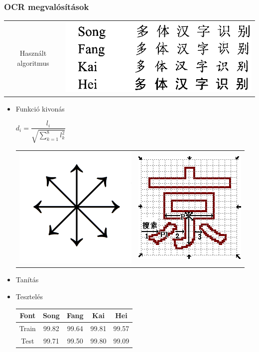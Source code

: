\documentclass{beamer}
\begin{document}
\begin{frame}[fragile]
\frametitle{OCR megvalósítások}
\begin{tabular}{c c}
{\large Használt algoritmus} & 
\includegraphics[scale=0.2, center]{chinese_fonts1}
\end{tabular}
\begin{itemize}
\item Funkció kivonás

\(d_i = \dfrac{l_i}{\sqrt{\displaystyle \sum_{k=1}^8 l_k^2}}\)
\begin{tabular}{ c c }
\includegraphics[scale=0.3]{8direction} & \includegraphics[scale=0.3]{ocr_PDC}
\end{tabular}
\item Tanítás
\item Tesztelés
\begin{table}
\centering
\begin{tabular}{ |c|c|c|c|c|}
\hline
Font & Song & Fang & Kai & Hei\\
\hline
Train & 99.82 & 99.64 & 99.81 & 99.57\\
\hline
Test & 99.71 & 99.50 & 99.80 & 99.09\\
\hline
\end{tabular}
\end{table}
\end{itemize}
\end{frame}
\end{document}
